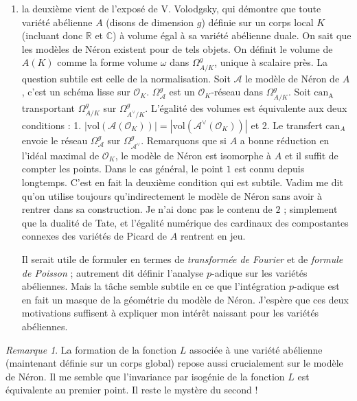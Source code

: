 \documentclass[11.8pt]{amsart}
\newcommand\R{\mathbb R}
\newcommand\C{\mathbb C}
\theoremstyle{plain}
\theoremstyle{definition}
\theoremstyle{remark}
\newtheorem*{rmq}{Remarque}
\begin{document}
\begin{enumerate}
\item la deuxième vient de l'exposé de V. Volodgsky, qui démontre que toute variété abélienne $A$ (disons de dimension $g$) définie sur un corps local $K$ (incluant donc $\R$ et $\C$) à volume égal à sa variété abélienne duale. On sait que les modèles de Néron existent pour de tels objets. On définit le volume de $A(K)$ comme la forme volume $\omega$ dans $\Omega^g_{A/K}$, unique à scalaire près. La question subtile est celle de la normalisation. Soit $\mathcal A$ le modèle de Néron de $A$, c'est un schéma lisse sur $\mathcal O_K$. $\Omega^g_{\mathcal A}$ est un $\mathcal O_K$-réseau dans $\Omega^g_{A/K}$. Soit $\mathrm{can_A}$ transportant $\Omega^g_{A/K}$ sur $\Omega^g_{A^\vee/K}$. L'égalité des volumes est équivalente aux deux conditions : 1. $|\mathrm{vol}(\mathcal{A}(\mathcal O_K))| = |\mathrm{vol}(\mathcal{A}^\vee(\mathcal O_K))|$ et 2. Le transfert $\mathrm{can}_A$ envoie le réseau $\Omega^g_{\mathcal A}$ sur $\Omega^g_{\mathcal A^\vee}$. Remarquons que si $A$ a bonne réduction en l'idéal maximal de $\mathcal O_K$, le modèle de Néron est isomorphe à $A$ et il suffit de compter les points. Dans le cas général, le point $1$ est connu depuis longtemps. C'est en fait la deuxième condition qui est subtile. Vadim me dit qu'on utilise toujours qu'indirectement le modèle de Néron sans avoir à rentrer dans sa construction. Je n'ai donc pas le contenu de $2$ ; simplement que la dualité de Tate, et l'égalité numérique des cardinaux des compostantes connexes des variétés de Picard de $A$ rentrent en jeu. 

Il serait utile de formuler en termes de \textit{transformée de Fourier} et de \textit{formule de Poisson} ; autrement dit définir l'analyse $p$-adique sur les variétés abéliennes. Mais la tâche semble subtile en ce que l'intégration $p$-adique est en fait un masque de la géométrie du modèle de Néron. J'espère que ces deux motivations suffisent à expliquer mon intérêt naissant pour les variétés abéliennes.
\end{enumerate}



\begin{rmq} La formation de la fonction $L$ associée à une variété abélienne (maintenant définie sur un corps global) repose aussi crucialement sur le modèle de Néron. Il me semble que l'invariance par isogénie de la fonction $L$ est équivalente au premier point. Il reste le mystère du second !  

\end{rmq}
\end{document}
